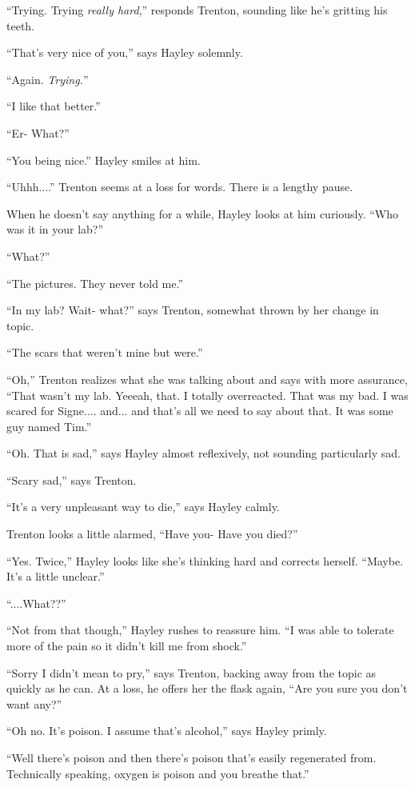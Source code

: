 ``Trying.  Trying \textit{really hard},'' responds Trenton, sounding like he's gritting his teeth.

``That's very nice of you,'' says Hayley solemnly.

``Again.  \textit{Trying.}''

``I like that better.''

``Er- What?''

``You being nice.'' Hayley smiles at him.

``Uhhh....'' Trenton seems at a loss for words.  There is a lengthy pause.



When he doesn't say anything for a while, Hayley looks at him curiously.  ``Who was it in your lab?''

``What?''

``The pictures.  They never told me.''

``In my lab?  Wait- what?'' says Trenton, somewhat thrown by her change in topic.

``The scars that weren't mine but were.''

``Oh,'' Trenton realizes what she was talking about and says with more assurance, ``That wasn't my lab.   Yeeeah, that.  I totally overreacted.  That was my bad.  I was scared for Signe.... and... and that's all we need to say about that.  It was some guy named Tim.''

``Oh.  That is sad,'' says Hayley almost reflexively, not sounding particularly sad.

``Scary sad,'' says Trenton.

``It's a very unpleasant way to die,'' says Hayley calmly.

Trenton looks a little alarmed, ``Have you- Have you died?''

``Yes.  Twice,'' Hayley looks like she's thinking hard and corrects herself.  ``Maybe.  It's a little unclear.''

``....What??'' 

``Not from that though,'' Hayley rushes to reassure him.  ``I was able to tolerate more of the pain so it didn't kill me from shock.''

``Sorry I didn't mean to pry,'' says Trenton, backing away from the topic as quickly as he can.  At a loss, he offers her the flask again, ``Are you sure you don't want any?''

``Oh no.  It's poison.  I assume that's alcohol,'' says Hayley primly.

``Well there's poison and then there's poison that's easily regenerated from.  Technically speaking, oxygen is poison and you breathe that.''

